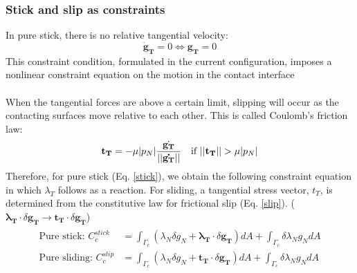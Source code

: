 \documentclass[12pt,3p]{article}
\numberwithin{equation}{section}
\begin{document}
\subsubsection{Stick and slip as constraints}
In pure stick, there is no relative tangential velocity:
\begin{equation}\label{stick}
\mathbf{\dot{g}_T} = 0 \Leftrightarrow \mathbf{g_T} = 0 
\end{equation}
This constraint condition, formulated in the current configuration, imposes a nonlinear constraint equation on the motion in the contact interface \\ \\
When the tangential forces are above a certain limit, slipping will occur as the contacting surfaces move relative to each other. This is called Coulomb's friction law: 
\begin{equation}\label{slip}
\mathbf{t_T} = - \mu \abs{p_N} \frac{\dot{\mathbf{g_T}}}{\abs{\abs{\mathbf{\dot{g_T}}}}} \quad \text{if } \abs{\abs{\mathbf{t_T}}} > \mu \abs{p_N}
\end{equation}
Therefore, for pure stick (Eq. \ref{stick}), we obtain the following constraint equation in which $\lambda_T$ follows as a reaction. For sliding, a tangential stress vector, $t_T$, is determined from the constitutive law for frictional slip (Eq. \ref{slip}). ($\mathbf{\lambda_T} \cdot \delta \mathbf{g_T} \rightarrow \mathbf{t_T} \cdot \delta \mathbf{g_T}$)
\begin{align}\label{628}
\begin{split}
\text{Pure stick: } C_c^{stick} &= \int_{\Gamma_c} (\lambda_N \delta g_N + \mathbf{\lambda_T} \cdot \delta \mathbf{g_T}) dA + \int_{\Gamma_c} \delta \lambda_N g_N dA \\
\text{Pure sliding: } C_c^{slip} &= \int_{\Gamma_c} (\lambda_N \delta g_N + \mathbf{t_T} \cdot \delta \mathbf{g_T}) dA + \int_{\Gamma_c} \delta \lambda_N g_N dA 
\end{split}
\end{align}
\end{document}
